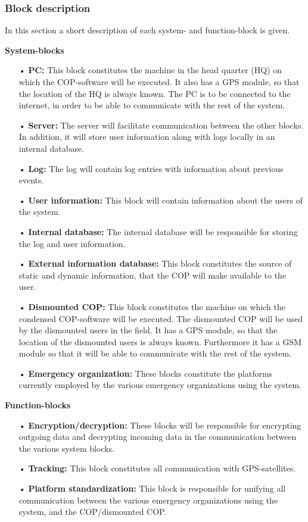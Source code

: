 \subsubsection{Block description}
In this section a short description of each system- and function-block is given.

\textbf{System-blocks}
\begin{enumerate}
\item[•] \textbf{PC:} This block constitutes the machine in the head quarter (HQ) on which the COP-software will be executed. It also has a GPS module, so that the location of the HQ is always known. The PC is to be connected to the internet, in order to be able to communicate with the rest of the system.
\item[•] \textbf{Server:} The server will facilitate communication between the other blocks. In addition, it will store user information along with logs locally in an internal database.
\item[•] \textbf{Log:} The log will contain log entries with information about previous events.
\item[•] \textbf{User information:} This block will contain information about the users of the system.
\item[•] \textbf{Internal database:} The internal database will be responsible for storing the log and user information.
\item[•] \textbf{External information database:} This block constitutes the source of static and dynamic information, that the COP will make available to the user.
\item[•] \textbf{Dismounted COP:} This block constitutes the machine on which the condensed COP-software will be executed. The dismounted COP will be used by the dismounted users in the field. It has a GPS module, so that the location of the dismounted users is always known. Furthermore it has a GSM module so that it will be able to communicate with the rest of the system.
\item[•] \textbf{Emergency organization:} These blocks constitute the platforms currently employed by the various emergency organizations using the system.
\end{enumerate}


\textbf{Function-blocks}
\begin{enumerate}
\item[•] \textbf{Encryption/decryption:} These blocks will be responsible for encrypting outgoing data and decrypting incoming data in the communication between the various system blocks.
\item[•] \textbf{Tracking:} This block constitutes all communication with GPS-satellites.
\item[•] \textbf{Platform standardization:} This block is responsible for unifying all communication between the various emergency organizations using the system, and the COP/dismounted COP.
\end{enumerate}

